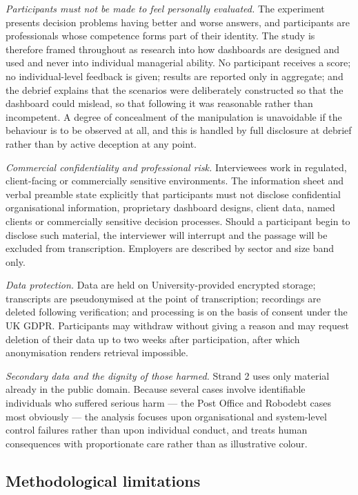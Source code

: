 \documentclass[11pt,a4paper]{article}
\numberwithin{figure}{section}
\numberwithin{table}{section}
\begin{document}
\emph{Participants must not be made to feel personally evaluated.} The experiment presents decision problems
having better and worse answers, and participants are professionals whose competence forms part of their
identity. The study is therefore framed throughout as research into how dashboards are designed and used
and never into individual managerial ability. No participant receives a score; no individual-level feedback
is given; results are reported only in aggregate; and the debrief explains that the scenarios were
deliberately constructed so that the dashboard could mislead, so that following it was reasonable rather
than incompetent. A degree of concealment of the manipulation is unavoidable if the behaviour is to be
observed at all, and this is handled by full disclosure at debrief rather than by active deception at any
point.

\emph{Commercial confidentiality and professional risk.} Interviewees work in regulated, client-facing or
commercially sensitive environments. The information sheet and verbal preamble state explicitly that
participants must not disclose confidential organisational information, proprietary dashboard designs,
client data, named clients or commercially sensitive decision processes. Should a participant begin to
disclose such material, the interviewer will interrupt and the passage will be excluded from transcription.
Employers are described by sector and size band only.

\emph{Data protection.} Data are held on University-provided encrypted storage; transcripts are
pseudonymised at the point of transcription; recordings are deleted following verification; and processing
is on the basis of consent under the UK GDPR. Participants may withdraw without giving a reason and may
request deletion of their data up to two weeks after participation, after which anonymisation renders
retrieval impossible.

\emph{Secondary data and the dignity of those harmed.} Strand 2 uses only material already in the public
domain. Because several cases involve identifiable individuals who suffered serious harm --- the Post Office
and Robodebt cases most obviously --- the analysis focuses upon organisational and system-level control
failures rather than upon individual conduct, and treats human consequences with proportionate care rather
than as illustrative colour.

\subsection{Methodological limitations}
\end{document}
